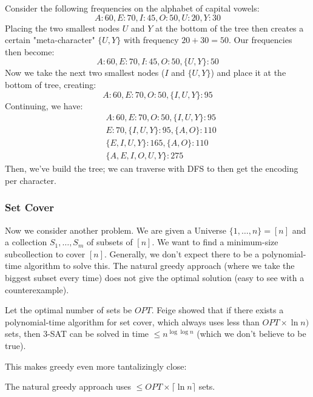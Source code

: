 \begin{example}
    Consider the following frequencies on the alphabet of capital vowels:
    \[ A: 60, E: 70, I: 45, O: 50, U: 20, Y: 30 \]
    Placing the two smallest nodes $U$ and $Y$ at the bottom of the tree then creates a certain "meta-character" $\{U, Y\}$ with frequency $20 + 30 = 50$. Our frequencies then become:
    \[ A: 60, E: 70, I:45, O: 50, \{U, Y\}: 50 \]
    Now we take the next two smallest nodes ($I$ and $\{U, Y\}$) and place it at the bottom of tree, creating:
    \[ A: 60, E: 70, O: 50, \{I, U, Y\}: 95 \]
    Continuing, we have:
    \begin{align*}
        &A: 60, E: 70, O: 50, \{I, U, Y\}: 95  \\
        &E: 70, \{I, U, Y\}: 95, \{A, O\}: 110 \\
        &\{E, I, U, Y\}: 165, \{A, O\}: 110 \\
        &\{A, E, I, O, U, Y\}: 275
    \end{align*}
    Then, we've build the tree; we can traverse with DFS to then get the encoding per character.
\end{example}

\subsubsection{Set Cover}
Now we consider another problem. We are given a Universe $\{1, \dots, n\} = [n]$ and a collection $S_1, \dots, S_m$ of subsets of $[n]$.
We want to find a minimum-size subcollection to cover $[n]$. Generally, we don't expect there to be a polynomial-time algorithm to solve this.
The natural greedy approach (where we take the biggest subset every time) does not give the optimal solution (easy to see with a counterexample).

Let the optimal number of sets be $OPT$.
Feige showed that if there exists a polynomial-time algorithm for set cover, which always uses less than $OPT \times \ln n)$ sets, then
3-SAT can be solved in time $\leq n^{\log \log n}$ (which we don't believe to be true).

This makes greedy even more tantalizingly close:
\begin{theorem}
    The natural greedy approach uses $\leq OPT \times \lceil \ln n \rceil$ sets.
\end{theorem}

